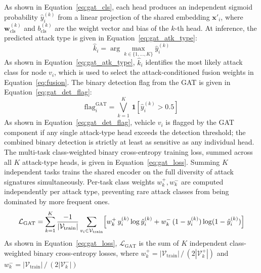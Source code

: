 \documentclass[12pt, a4paper]{report}
\begin{document}
As shown in Equation~\ref{eq:gat_cls}, each head produces an
independent sigmoid probability $\hat{y}_i^{(k)}$ from a linear
projection of the shared embedding $\mathbf{x}'_i$, where
$\mathbf{w}_{\mathrm{cls}}^{(k)}$ and $b_{\mathrm{cls}}^{(k)}$ are
the weight vector and bias of the $k$-th head.
At inference, the predicted attack type is given in
Equation~\ref{eq:gat_atk_type}:
\begin{equation}
  \hat{k}_i = \arg\max_{k \in \{1,\ldots,K\}} \hat{y}_i^{(k)}
  \label{eq:gat_atk_type}
\end{equation}
As shown in Equation~\ref{eq:gat_atk_type}, $\hat{k}_i$ identifies
the most likely attack class for node $v_i$, which is used to select
the attack-conditioned fusion weights in Equation~\ref{eq:fusion}.
The binary detection flag from the GAT is given in
Equation~\ref{eq:gat_det_flag}:
\begin{equation}
  \mathrm{flag}_i^{\mathrm{GAT}} =
    \bigvee_{k=1}^{K}\,
    \mathbf{1}\!\left[\hat{y}_i^{(k)} > 0.5\right]
  \label{eq:gat_det_flag}
\end{equation}
As shown in Equation~\ref{eq:gat_det_flag}, vehicle $v_i$ is flagged
by the GAT component if any single attack-type head exceeds the
detection threshold; the combined binary detection is strictly at
least as sensitive as any individual head.
\newline
\newline
The multi-task class-weighted binary cross-entropy training loss,
summed across all $K$ attack-type heads, is given in
Equation~\ref{eq:gat_loss}.
\newline
\newline
Summing $K$ independent tasks trains the shared encoder on the full
diversity of attack signatures simultaneously. Per-task class weights
$w_k^+, w_k^-$ are computed independently per attack type, preventing
rare attack classes from being dominated by more frequent ones.
\begin{equation}
  \mathcal{L}_{\mathrm{GAT}} = \sum_{k=1}^{K}
    \frac{-1}{|\mathcal{V}_{\mathrm{train}}|}
    \sum_{v_i \in \mathcal{V}_{\mathrm{train}}}
    \Bigl[
      w_k^{+}\,y_i^{(k)} \log \hat{y}_i^{(k)}
      + w_k^{-}\,(1-y_i^{(k)})\log(1-\hat{y}_i^{(k)})
    \Bigr]
  \label{eq:gat_loss}
\end{equation}
As shown in Equation~\ref{eq:gat_loss},
$\mathcal{L}_{\mathrm{GAT}}$ is the sum of $K$ independent
class-weighted binary cross-entropy losses, where
$w_k^{+} = |\mathcal{V}_{\mathrm{train}}|\,/\,(2|\mathcal{V}_k^{+}|)$
and $w_k^{-} = |\mathcal{V}_{\mathrm{train}}|\,/\,(2|\mathcal{V}_k^{-}|)$
\end{document}

